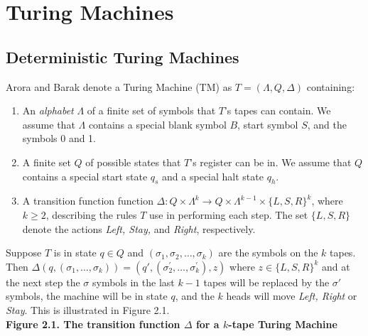 \documentclass[11pt]{article}
\begin{document}
\section{Turing Machines} 

\subsection{Deterministic Turing Machines} 

 Arora and Barak denote a Turing Machine (TM) as $ T = (\Lambda, Q, \Delta) $ containing:
\begin{enumerate}
\item An \textit{alphabet} $ \Lambda $ of a finite set of symbols that $ T $'s tapes can contain. We assume that $ \Lambda $ contains a special blank symbol $ B $, start symbol $ S $, and the symbols 0 and 1. 
\item A finite set $ Q $ of possible states that $ T $'s register can be in. We assume that $ Q $ contains a special start state $ q_{s} $ and a special halt state $ q_{h} $. 
\item A transition function function $ \Delta : Q \times \Lambda^{k} \rightarrow Q \times \Lambda^{k - 1} \times \{L, S, R\}^{k} $, where $ k \geq 2$, describing the rules $ T $ use in performing each step. The set $\{L ,S, R\}$ denote the actions \textit{Left, Stay,} and \textit{Right}, respectively. 
\end{enumerate}

Suppose $ T $ is in state $ q \in Q $ and $ (\sigma_1, \sigma_2, \dots, \sigma_k) $ are the symbols on the $ k $ tapes. Then $ \Delta(q, (\sigma_1, \dots, \sigma_k)) = (q', (\sigma_{2}^{'}, \dots, \sigma_{k}^{'}), z) $ where $ z \in \{L, S, R\}^k $ and at the next step the $ \sigma $ symbols in the last $ k - 1 $ tapes will be replaced by the $ \sigma' $ symbols, the machine will be in state $ q $, and the $ k $ heads will move \textit{Left, Right} or \textit{Stay}. This is illustrated in Figure 2.1. \\

\textbf{Figure 2.1. The transition function $ \Delta $ for a $ k $-tape Turing Machine}
\end{document}
